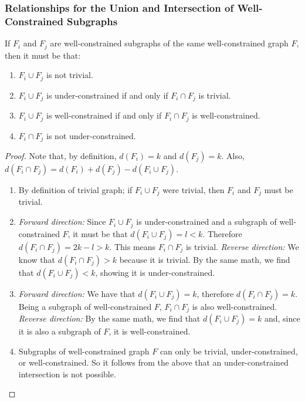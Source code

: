 
\subsubsection{Relationships for the Union and Intersection of Well-Constrained Subgraphs}
\label{sec:union_intersection}

\begin{lemma}\label{lemma:union_intersection}
If $F_i$ and $F_j$ are well-constrained subgraphs of the same well-constrained graph $F$, then it must be that:
\begin{enumerate}
    \item $F_i\cup F_j$ is not trivial.
    \item $F_i\cup F_j$ is under-constrained if and only if $F_i\cap F_j$ is trivial.
    \item $F_i\cup F_j$ is well-constrained if and only if $F_i\cap F_j$ is well-constrained.
    \item $F_i\cap F_j$ is not under-constrained.
\end{enumerate}
\end{lemma}

\begin{proof}
Note that, by definition, $d(F_i)=k$ and $d(F_j)=k$. Also, $d(F_i\cap F_j)=d(F_i)+d(F_j)-d(F_i\cup F_j)$.
\begin{enumerate}
    \item By definition of trivial graph; if $F_i\cup F_j$ were trivial, then $F_i$ and $F_j$ must be trivial.

    \item \textit{Forward direction:} Since $F_i\cup F_j$ is under-constrained and a subgraph of well-constrained $F$, it must be that $d(F_i\cup F_j)=l<k$. Therefore $d(F_i\cap F_j)=2k-l>k$. This means $F_i\cap F_j$ is trivial. \textit{Reverse direction:} We know that $d(F_i\cap F_j)>k$ because it is trivial. By the same math, we find that $d(F_i\cup F_j)<k$, showing it is under-constrained.

    \item \textit{Forward direction:} We have that $d(F_i\cup F_j)=k$, therefore $d(F_i\cap F_j)=k$. Being a subgraph of well-constrained $F$, $F_i\cap F_j$ is also well-constrained. \textit{Reverse direction:} By the same math, we find that $d(F_i\cup F_j)=k$ and, since it is also a subgraph of $F$, it is well-constrained.

    \item Subgraphs of well-constrained graph $F$ can only be trivial, under-constrained, or well-constrained. So it follows from the above that an under-constrained intersection is not possible.
\end{enumerate}
\end{proof}



